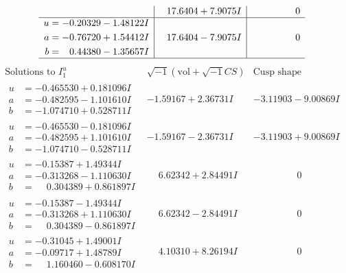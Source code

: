 \documentclass[1p]{elsarticle_modified}
\theoremstyle{definition}
\newcommand{\I}{\sqrt{-1}}
\begin{document}
$$\begin{array}{c|c|c}
 & \phantom{-}17.6404 + 7.9075 I & \phantom{-0.000000 } 0 \\ \hline\begin{aligned}
u &= -0.20329 - 1.48122 I \\
a &= -0.76720 + 1.54412 I \\
b &= \phantom{-}0.44380 - 1.35657 I\end{aligned}
 & \phantom{-}17.6404 - 7.9075 I & \phantom{-0.000000 } 0\\
 \hline 
 \end{array}$$\newpage$$\begin{array}{c|c|c}  
\text{Solutions to }I^u_{1}& \I (\text{vol} + \sqrt{-1}CS) & \text{Cusp shape}\\
 \hline 
\begin{aligned}
u &= -0.465530 + 0.181096 I \\
a &= -0.482595 - 1.101610 I \\
b &= -1.074710 + 0.528711 I\end{aligned}
 & -1.59167 + 2.36731 I & -3.11903 - 9.00869 I \\ \hline\begin{aligned}
u &= -0.465530 - 0.181096 I \\
a &= -0.482595 + 1.101610 I \\
b &= -1.074710 - 0.528711 I\end{aligned}
 & -1.59167 - 2.36731 I & -3.11903 + 9.00869 I \\ \hline\begin{aligned}
u &= -0.15387 + 1.49344 I \\
a &= -0.313268 - 1.110630 I \\
b &= \phantom{-}0.304389 + 0.861897 I\end{aligned}
 & \phantom{-}6.62342 + 2.84491 I & \phantom{-0.000000 } 0 \\ \hline\begin{aligned}
u &= -0.15387 - 1.49344 I \\
a &= -0.313268 + 1.110630 I \\
b &= \phantom{-}0.304389 - 0.861897 I\end{aligned}
 & \phantom{-}6.62342 - 2.84491 I & \phantom{-0.000000 } 0 \\ \hline\begin{aligned}
u &= -0.31045 + 1.49001 I \\
a &= -0.09717 + 1.48789 I \\
b &= \phantom{-}1.160460 - 0.608170 I\end{aligned}
 & \phantom{-}4.10310 + 8.26194 I & \phantom{-0.000000 } 0 \\ \hline\begin{aligned}

\end{aligned}
\end{array}$$
\end{document}
